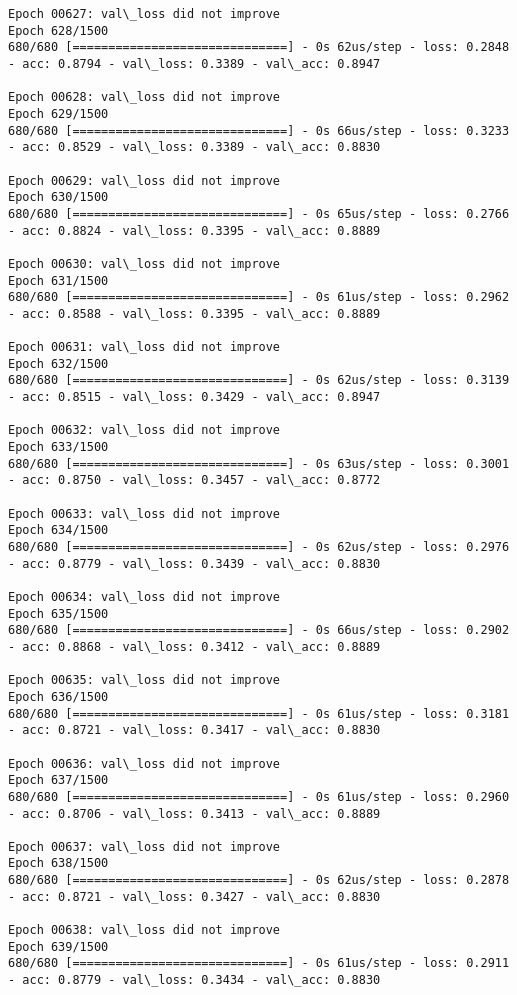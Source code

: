 \documentclass[11pt]{article}
\begin{document}
\begin{Verbatim}[commandchars=\\\{\}]
Epoch 00627: val\_loss did not improve
Epoch 628/1500
680/680 [==============================] - 0s 62us/step - loss: 0.2848 - acc: 0.8794 - val\_loss: 0.3389 - val\_acc: 0.8947

Epoch 00628: val\_loss did not improve
Epoch 629/1500
680/680 [==============================] - 0s 66us/step - loss: 0.3233 - acc: 0.8529 - val\_loss: 0.3389 - val\_acc: 0.8830

Epoch 00629: val\_loss did not improve
Epoch 630/1500
680/680 [==============================] - 0s 65us/step - loss: 0.2766 - acc: 0.8824 - val\_loss: 0.3395 - val\_acc: 0.8889

Epoch 00630: val\_loss did not improve
Epoch 631/1500
680/680 [==============================] - 0s 61us/step - loss: 0.2962 - acc: 0.8588 - val\_loss: 0.3395 - val\_acc: 0.8889

Epoch 00631: val\_loss did not improve
Epoch 632/1500
680/680 [==============================] - 0s 62us/step - loss: 0.3139 - acc: 0.8515 - val\_loss: 0.3429 - val\_acc: 0.8947

Epoch 00632: val\_loss did not improve
Epoch 633/1500
680/680 [==============================] - 0s 63us/step - loss: 0.3001 - acc: 0.8750 - val\_loss: 0.3457 - val\_acc: 0.8772

Epoch 00633: val\_loss did not improve
Epoch 634/1500
680/680 [==============================] - 0s 62us/step - loss: 0.2976 - acc: 0.8779 - val\_loss: 0.3439 - val\_acc: 0.8830

Epoch 00634: val\_loss did not improve
Epoch 635/1500
680/680 [==============================] - 0s 66us/step - loss: 0.2902 - acc: 0.8868 - val\_loss: 0.3412 - val\_acc: 0.8889

Epoch 00635: val\_loss did not improve
Epoch 636/1500
680/680 [==============================] - 0s 61us/step - loss: 0.3181 - acc: 0.8721 - val\_loss: 0.3417 - val\_acc: 0.8830

Epoch 00636: val\_loss did not improve
Epoch 637/1500
680/680 [==============================] - 0s 61us/step - loss: 0.2960 - acc: 0.8706 - val\_loss: 0.3413 - val\_acc: 0.8889

Epoch 00637: val\_loss did not improve
Epoch 638/1500
680/680 [==============================] - 0s 62us/step - loss: 0.2878 - acc: 0.8721 - val\_loss: 0.3427 - val\_acc: 0.8830

Epoch 00638: val\_loss did not improve
Epoch 639/1500
680/680 [==============================] - 0s 61us/step - loss: 0.2911 - acc: 0.8779 - val\_loss: 0.3434 - val\_acc: 0.8830


\end{Verbatim}
\end{document}
